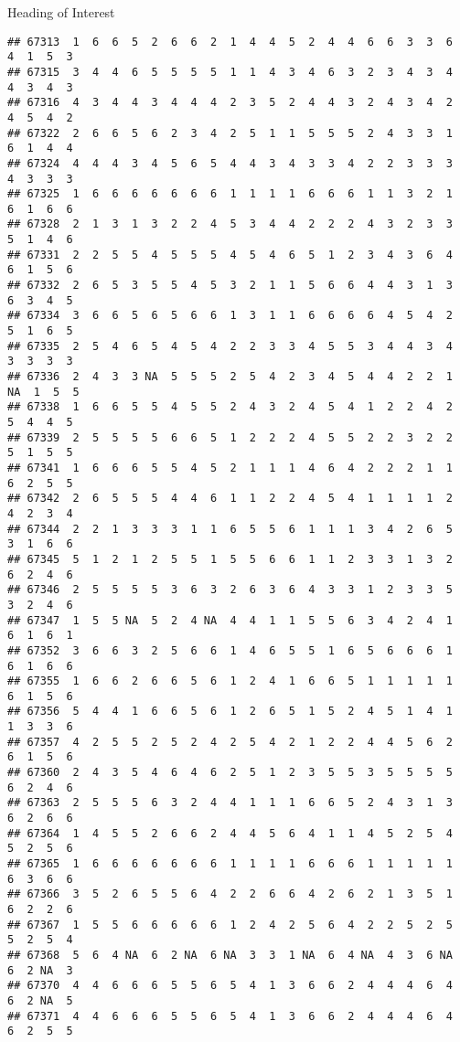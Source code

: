 \documentclass[
  ignorenonframetext,
]{beamer}
\begin{document}
\begin{frame}[fragile]{Heading of Interest}
\begin{verbatim}
## 67313  1  6  6  5  2  6  6  2  1  4  4  5  2  4  4  6  6  3  3  6  4  1  5  3
## 67315  3  4  4  6  5  5  5  5  1  1  4  3  4  6  3  2  3  4  3  4  4  3  4  3
## 67316  4  3  4  4  3  4  4  4  2  3  5  2  4  4  3  2  4  3  4  2  4  5  4  2
## 67322  2  6  6  5  6  2  3  4  2  5  1  1  5  5  5  2  4  3  3  1  6  1  4  4
## 67324  4  4  4  3  4  5  6  5  4  4  3  4  3  3  4  2  2  3  3  3  4  3  3  3
## 67325  1  6  6  6  6  6  6  6  1  1  1  1  6  6  6  1  1  3  2  1  6  1  6  6
## 67328  2  1  3  1  3  2  2  4  5  3  4  4  2  2  2  4  3  2  3  3  5  1  4  6
## 67331  2  2  5  5  4  5  5  5  4  5  4  6  5  1  2  3  4  3  6  4  6  1  5  6
## 67332  2  6  5  3  5  5  4  5  3  2  1  1  5  6  6  4  4  3  1  3  6  3  4  5
## 67334  3  6  6  5  6  5  6  6  1  3  1  1  6  6  6  6  4  5  4  2  5  1  6  5
## 67335  2  5  4  6  5  4  5  4  2  2  3  3  4  5  5  3  4  4  3  4  3  3  3  3
## 67336  2  4  3  3 NA  5  5  5  2  5  4  2  3  4  5  4  4  2  2  1 NA  1  5  5
## 67338  1  6  6  5  5  4  5  5  2  4  3  2  4  5  4  1  2  2  4  2  5  4  4  5
## 67339  2  5  5  5  5  6  6  5  1  2  2  2  4  5  5  2  2  3  2  2  5  1  5  5
## 67341  1  6  6  6  5  5  4  5  2  1  1  1  4  6  4  2  2  2  1  1  6  2  5  5
## 67342  2  6  5  5  5  4  4  6  1  1  2  2  4  5  4  1  1  1  1  2  4  2  3  4
## 67344  2  2  1  3  3  3  1  1  6  5  5  6  1  1  1  3  4  2  6  5  3  1  6  6
## 67345  5  1  2  1  2  5  5  1  5  5  6  6  1  1  2  3  3  1  3  2  6  2  4  6
## 67346  2  5  5  5  5  3  6  3  2  6  3  6  4  3  3  1  2  3  3  5  3  2  4  6
## 67347  1  5  5 NA  5  2  4 NA  4  4  1  1  5  5  6  3  4  2  4  1  6  1  6  1
## 67352  3  6  6  3  2  5  6  6  1  4  6  5  5  1  6  5  6  6  6  1  6  1  6  6
## 67355  1  6  6  2  6  6  5  6  1  2  4  1  6  6  5  1  1  1  1  1  6  1  5  6
## 67356  5  4  4  1  6  6  5  6  1  2  6  5  1  5  2  4  5  1  4  1  1  3  3  6
## 67357  4  2  5  5  2  5  2  4  2  5  4  2  1  2  2  4  4  5  6  2  6  1  5  6
## 67360  2  4  3  5  4  6  4  6  2  5  1  2  3  5  5  3  5  5  5  5  6  2  4  6
## 67363  2  5  5  5  6  3  2  4  4  1  1  1  6  6  5  2  4  3  1  3  6  2  6  6
## 67364  1  4  5  5  2  6  6  2  4  4  5  6  4  1  1  4  5  2  5  4  5  2  5  6
## 67365  1  6  6  6  6  6  6  6  1  1  1  1  6  6  6  1  1  1  1  1  6  3  6  6
## 67366  3  5  2  6  5  5  6  4  2  2  6  6  4  2  6  2  1  3  5  1  6  2  2  6
## 67367  1  5  5  6  6  6  6  6  1  2  4  2  5  6  4  2  2  5  2  5  5  2  5  4
## 67368  5  6  4 NA  6  2 NA  6 NA  3  3  1 NA  6  4 NA  4  3  6 NA  6  2 NA  3
## 67370  4  4  6  6  6  5  5  6  5  4  1  3  6  6  2  4  4  4  6  4  6  2 NA  5
## 67371  4  4  6  6  6  5  5  6  5  4  1  3  6  6  2  4  4  4  6  4  6  2  5  5

\end{verbatim}
\end{frame}
\end{document}
